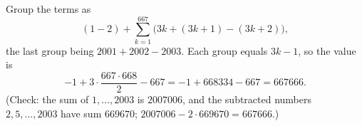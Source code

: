 Group the terms as
\[(1-2)+\sum_{k=1}^{667}\bigl(3k+(3k+1)-(3k+2)\bigr),\]
the last group being $2001+2002-2003$. Each group equals $3k-1$, so the value is
\[-1+3\cdot\dfrac{667\cdot668}{2}-667=-1+668334-667=\boxed{667666}.\]
(Check: the sum of $1,\dots,2003$ is $2007006$, and the subtracted numbers $2,5,\dots,2003$ have sum $669670$; $2007006-2\cdot669670=667666$.)
